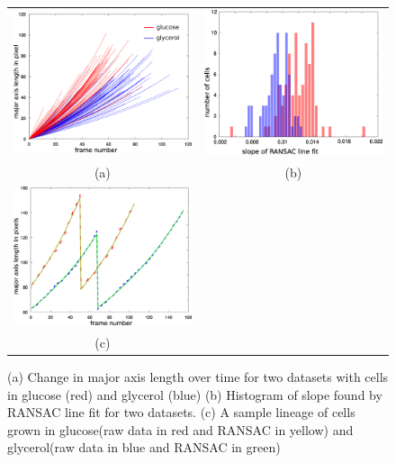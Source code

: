 \documentclass[journal]{IEEEtran}
\begin{document}
\begin{figure}[!h]
	\centering
	\begin{tabular}{c c }
	\includegraphics[width=0.45\linewidth]{growthrateed.png} & \includegraphics[width=0.45\linewidth]{histoed.png} \\
	(a) & (b)\\
	 \includegraphics[width=0.45\linewidth]{lineagebothed.png}&\\
	 (c) &
	\end{tabular}
	\caption{(a) Change in major axis length over time for two datasets with cells in glucose (red) and glycerol (blue) (b) Histogram of slope found by RANSAC line fit for two datasets. (c) A sample lineage of  cells grown in glucose(raw data in red and RANSAC in yellow) and glycerol(raw data in blue and RANSAC in green) }
	\label{fig:growthrate}
	
\end{figure}
\end{document}
